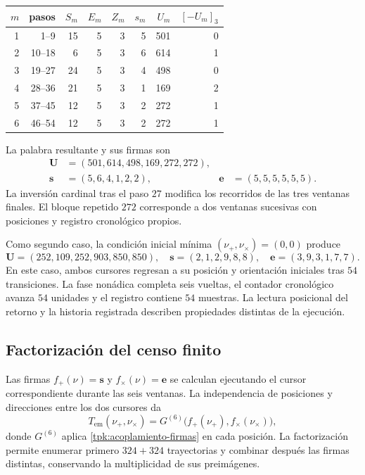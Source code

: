 \begin{tablacompleta}[htbp]
\caption{Las seis ventanas de la condición inicial \((16,84)\).}
\label{tpk:tabla-seis501}
\begin{tabular}{@{}rrrrrrrr@{}}
\toprule
\(m\)&pasos&\(S_m\)&\(E_m\)&\(Z_m\)&\(s_m\)&\(U_m\)&\([-U_m]_3\)\\
\midrule
1&1--9&15&5&3&5&501&0\\
2&10--18&6&5&3&6&614&1\\
3&19--27&24&5&3&4&498&0\\
4&28--36&21&5&3&1&169&2\\
5&37--45&12&5&3&2&272&1\\
6&46--54&12&5&3&2&272&1\\
\bottomrule
\end{tabular}
\end{tablacompleta}

La palabra resultante y sus firmas son
\begin{align*}
 \mathbf U&=(501,614,498,169,272,272),\\
 \mathbf s&=(5,6,4,1,2,2),&
 \mathbf e&=(5,5,5,5,5,5).
\end{align*}
La inversión cardinal tras el paso \(27\) modifica los recorridos de las
tres ventanas finales. El bloque repetido \(272\) corresponde a dos
ventanas sucesivas con posiciones y registro cronológico propios.

Como segundo caso, la condición inicial mínima \((\nu_+,\nu_\times)=(0,0)\)
produce
\[
 \mathbf U=(252,109,252,903,850,850),\quad
 \mathbf s=(2,1,2,9,8,8),\quad
 \mathbf e=(3,9,3,1,7,7).
\]
En este caso, ambos cursores regresan a su posición y orientación iniciales
tras \(54\) transiciones. La fase nonádica completa seis vueltas, el
contador cronológico avanza \(54\) unidades y el registro contiene
\(54\) muestras. La lectura posicional del retorno y
la historia registrada describen propiedades distintas de la ejecución.

\subsection{Factorización del censo finito}
\label{tpk:censo}

Las firmas \(f_+(\nu)=\mathbf s\) y \(f_\times(\nu)=\mathbf e\) se
calculan ejecutando el cursor correspondiente durante las seis ventanas.
La independencia de posiciones y direcciones entre los dos cursores da
\begin{equation}
 T_{\mathrm{em}}(\nu_+,\nu_\times)
   =G^{(6)}\bigl(f_+(\nu_+),f_\times(\nu_\times)\bigr),
 \label{tpk:factorizacion}
\end{equation}
donde \(G^{(6)}\) aplica \eqref{tpk:acoplamiento-firmas} en cada posición.
La factorización permite enumerar primero \(324+324\) trayectorias y
combinar después las firmas distintas, conservando la multiplicidad de
sus preimágenes.

